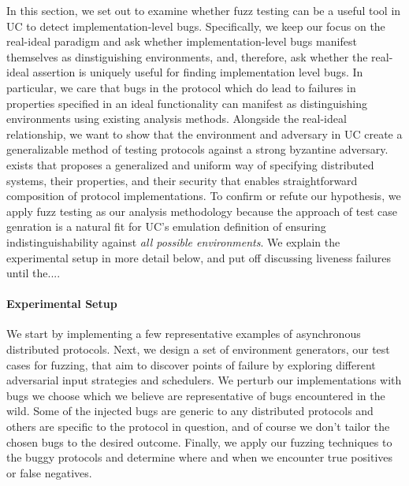 In this section, we set out to examine whether fuzz testing can be a useful
tool in UC to detect implementation-level bugs.  Specifically, we keep our
focus on the real-ideal paradigm and ask whether implementation-level bugs
manifest themselves as dinstiguishing environments, and, therefore, ask whether
the real-ideal assertion is uniquely useful for finding implementation level
bugs.  In particular, we care that bugs in the protocol which do lead to
failures in properties specified in an ideal functionality can manifest as
distinguishing environments using existing analysis methods.  Alongside the
real-ideal relationship, we want to show that the environment and adversary in
UC create a generalizable method of testing protocols against a strong
byzantine adversary.  %
exists that proposes a generalized and uniform way of specifying distributed
systems, their properties, and their security that enables straightforward
composition of protocol implementations.  To confirm or refute our hypothesis,
we apply fuzz testing as our analysis methodology because the approach of test
case genration is a natural fit for UC's emulation definition of ensuring
indistinguishability against \emph{all possible environments}.  We explain the
experimental setup in more detail below, and put off discussing liveness
failures until the....


\paragraph{Experimental Setup}
We start by implementing a few representative examples of asynchronous distributed protocols.
Next, we design a set of environment generators, our test cases for fuzzing, that aim to discover points of failure by exploring different adversarial input strategies and schedulers.
We perturb our implementations with bugs we choose which we believe are representative of bugs encountered in the wild.
Some of the injected bugs are generic to any distributed protocols and others are specific to the protocol in question, and of course we don't tailor the chosen bugs to the desired outcome.
Finally, we apply our fuzzing techniques to the buggy protocols and determine where and when we encounter true positives or false negatives. 

